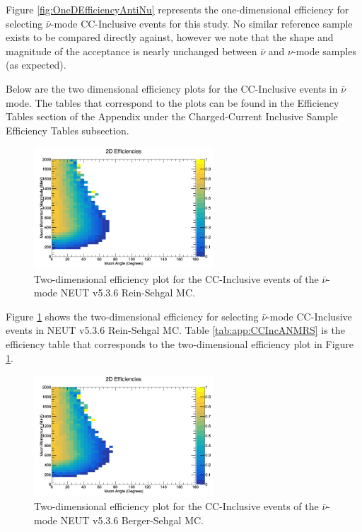 \documentclass[11pt]{article}
\begin{document}
Figure \ref*{fig:OneDEfficiencyAntiNu} represents the one-dimensional efficiency for selecting $\bar{\nu}$-mode CC-Inclusive events for this study. No similar reference sample exists to be compared directly against, however we note that the shape and magnitude of the acceptance is nearly unchanged between $\bar{\nu}$ and $\nu$-mode samples (as expected).

Below are the two dimensional efficiency plots for the CC-Inclusive events in $\bar{\nu}$ mode. The tables that correspond to the plots can be found in the Efficiency Tables section of the Appendix under the Charged-Current Inclusive Sample Efficiency Tables subsection.

\begin{figure}[H]
\centering
\includegraphics[width=0.6\textwidth]{CCInclusivePlots/2DEffCompareANMRS.png}
\caption{Two-dimensional efficiency plot for the CC-Inclusive events of the $\bar{\nu}$-mode NEUT v5.3.6 Rein-Sehgal MC.}
\label{fig:ANMTwoDEfficiencyRS}
\end{figure}

Figure \ref*{fig:ANMTwoDEfficiencyRS} shows the two-dimensional efficiency for selecting $\bar{\nu}$-mode CC-Inclusive events in NEUT v5.3.6 Rein-Sehgal MC. Table \ref*{tab:app:CCIncANMRS} is the efficiency table that corresponds to the two-dimensional efficiency plot in Figure \ref*{fig:ANMTwoDEfficiencyRS}.

\begin{figure}[H]
\centering
\includegraphics[width=0.6\textwidth]{CCInclusivePlots/2DEffCompareANMBS.png}
\caption{Two-dimensional efficiency plot for the CC-Inclusive events of the $\bar{\nu}$-mode NEUT v5.3.6 Berger-Sehgal MC.}
\label{fig:ANMTwoDEfficiencyBS}
\end{figure}
\end{document}
